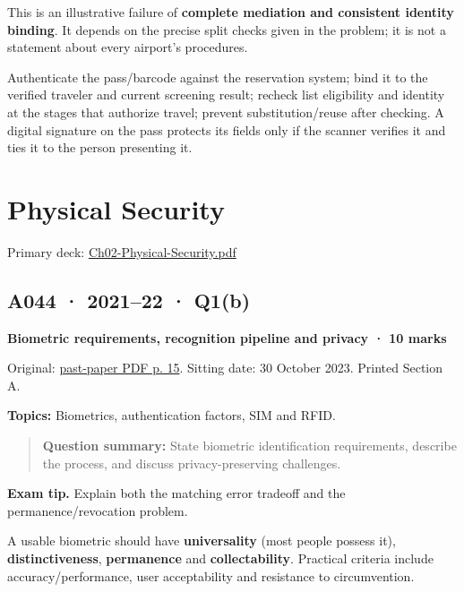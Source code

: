 \documentclass[11pt,a4paper]{article}
\begin{document}
This is an illustrative failure of \textbf{complete mediation and consistent identity binding}. It depends on the precise split checks given in the problem; it is not a statement about every airport's procedures.


Authenticate the pass/\allowbreak{}barcode against the reservation system; bind it to the verified traveler and current screening result; recheck list eligibility and identity at the stages that authorize travel; prevent substitution/\allowbreak{}reuse after checking. A digital signature on the pass protects its fields only if the scanner verifies it and ties it to the person presenting it.



\clearpage
\section{Physical Security}

Primary deck: \href{../slides/Ch02-Physical-Security.pdf}{Ch02-Physical-Security.\allowbreak{}pdf}




\subsection{A044 · 2021–22 · Q1(b)}\label{a044}

\textbf{Biometric requirements,\allowbreak{} recognition pipeline and privacy · 10 marks}


Original: \href{../../CSE405-Security_Merged.pdf\#page=15}{past-paper PDF p. 15}. Sitting date: 30 October 2023. Printed Section A.


\textbf{Topics:} Biometrics,\allowbreak{} authentication factors,\allowbreak{} SIM and RFID.



\begin{quote}\small

\textbf{Question summary:} State biometric identification requirements,\allowbreak{} describe the process,\allowbreak{} and discuss privacy-preserving challenges.



\end{quote}


{\color{ForestGreen}\textbf{Exam tip.} Explain both the matching error tradeoff and the permanence/\allowbreak{}revocation problem.}


A usable biometric should have \textbf{universality} (most people possess it),\allowbreak{} \textbf{distinctiveness},\allowbreak{} \textbf{permanence} and \textbf{collectability}. Practical criteria include accuracy/\allowbreak{}performance,\allowbreak{} user acceptability and resistance to circumvention.
\end{document}
